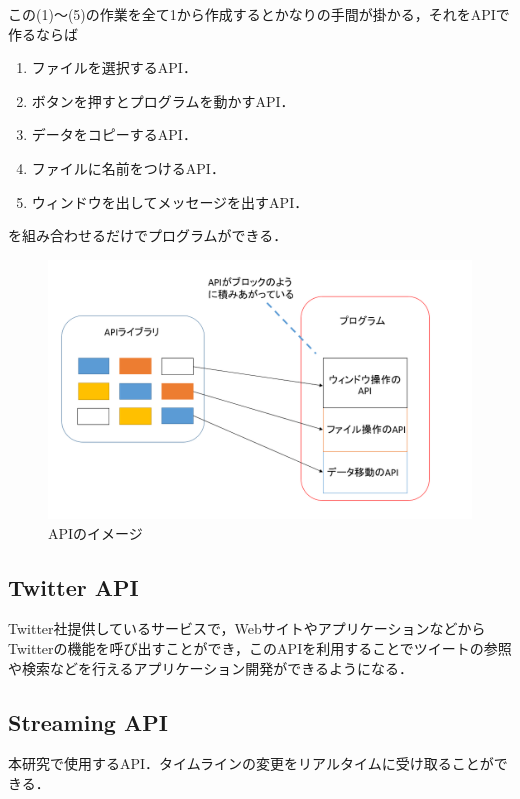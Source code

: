 \clearpage

この(1)～(5)の作業を全て1から作成するとかなりの手間が掛かる，それをAPIで作るならば

\begin{enumerate}
 \item ファイルを選択するAPI．
 \item ボタンを押すとプログラムを動かすAPI．
 \item データをコピーするAPI．
 \item ファイルに名前をつけるAPI．
 \item ウィンドウを出してメッセージを出すAPI．
\end{enumerate}
を組み合わせるだけでプログラムができる．

\begin{figure}[H]
\centering
\includegraphics[width=15cm]{API.png}
\caption{APIのイメージ}\label{APIのイメージ}
\end{figure}



\subsection{Twitter API}

Twitter社提供しているサービスで，WebサイトやアプリケーションなどからTwitterの機能を呼び出すことができ，このAPIを利用することでツイートの参照や検索などを行えるアプリケーション開発ができるようになる\cite{twitterapi}．


\subsection{Streaming API}

本研究で使用するAPI．タイムラインの変更をリアルタイムに受け取ることができる．

